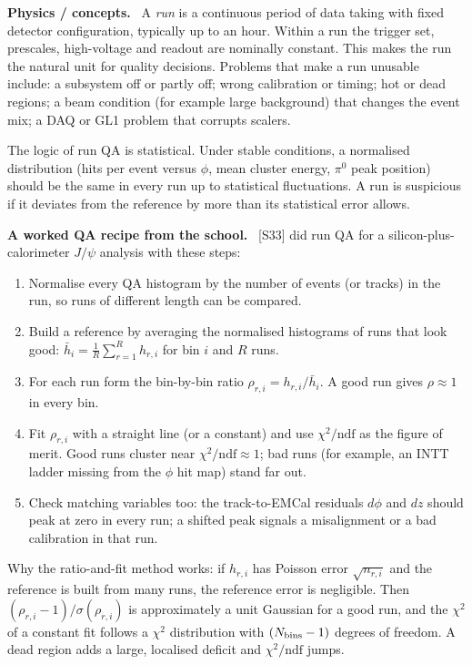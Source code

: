 \documentclass[11pt,letterpaper]{article}
\newcommand{\hd}[1]{\par\smallskip\noindent\textbf{\color{blue!50!black}#1.}\ }
\begin{document}
\hd{Physics / concepts} A \emph{run} is a continuous period of data taking with fixed detector configuration, typically up to an hour.
Within a run the trigger set, prescales, high-voltage and readout are nominally constant. This makes the run the natural unit for
quality decisions. Problems that make a run unusable include: a subsystem off or partly off; wrong calibration or timing; hot or dead
regions; a beam condition (for example large background) that changes the event mix; a DAQ or GL1 problem that corrupts scalers.

The logic of run QA is statistical. Under stable conditions, a normalised distribution (hits per event versus $\phi$, mean cluster energy,
$\pi^0$ peak position) should be the same in every run up to statistical fluctuations. A run is suspicious if it deviates from the
reference by more than its statistical error allows.

\hd{A worked QA recipe from the school} [S33] did run QA for a silicon-plus-calorimeter $J/\psi$ analysis with these steps:
\begin{enumerate}
\item Normalise every QA histogram by the number of events (or tracks) in the run, so runs of different length can be compared.
\item Build a reference by averaging the normalised histograms of runs that look good: $\bar h_i = \frac{1}{R}\sum_{r=1}^{R} h_{r,i}$
for bin $i$ and $R$ runs.
\item For each run form the bin-by-bin ratio $\rho_{r,i} = h_{r,i}/\bar h_i$. A good run gives $\rho \approx 1$ in every bin.
\item Fit $\rho_{r,i}$ with a straight line (or a constant) and use $\chi^2/\mathrm{ndf}$ as the figure of merit. Good runs cluster
near $\chi^2/\mathrm{ndf}\approx 1$; bad runs (for example, an INTT ladder missing from the $\phi$ hit map) stand far out.
\item Check matching variables too: the track-to-EMCal residuals $d\phi$ and $dz$ should peak at zero in every run; a shifted peak
signals a misalignment or a bad calibration in that run.
\end{enumerate}

Why the ratio-and-fit method works: if $h_{r,i}$ has Poisson error $\sqrt{n_{r,i}}$ and the reference is built from many runs, the
reference error is negligible. Then $(\rho_{r,i}-1)/\sigma(\rho_{r,i})$ is approximately a unit Gaussian for a good run, and the
$\chi^2$ of a constant fit follows a $\chi^2$ distribution with $(N_{\rm bins}-1)$ degrees of freedom. A dead region adds a large,
localised deficit and $\chi^2/\mathrm{ndf}$ jumps.
\end{document}
